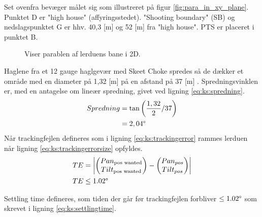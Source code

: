 Set ovenfra bevæger målet sig som illustreret på figur \ref{fig:para_in_xy_plane}.
Punktet D er "high house" (affyringsstedet).
"Shooting boundary" (SB) og nedslagspunktet G er hhv. 40,3 [m] og 52 [m] fra "high house". PTS er placeret i punktet B.\\
\begin{figure}[h!]
\centering
{}
\caption[Lerduens parabel i 2D]{Viser parablen af lerduens bane i 2D.}
\end{figure}

Haglene fra et 12 gauge haglgevær med Skeet Choke spredes så de dækker et område
med en diameter på 1,32 [m] på en afstand på 37 [m] \citep[Pattern and choke]{patternandchoke}.
Spredningsvinklen er, med en antagelse om lineær spredning, givet ved ligning \ref{eq:ks:spredning}.
\begin{align}
  Spredning &= \tan \left(\frac{1,32}{2} / 37 \right) \\
  &= 2,04 \degree
  \label{eq:ks:spredning}
\end{align}
Når trackingfejlen defineres som i ligning \ref{eq:ks:trackingerror} rammes 
lerduen når ligning \ref{eq:ks:trackingerrorsize} opfyldes.
\begin{align}
  TE &= \left | \begin{pmatrix}  Pan_{\text{pos wanted}}\\ Tilt_{\text{pos wanted}}\end{pmatrix} - \begin{pmatrix} Pan_{pos}\\ 
  Tilt_{pos}\end{pmatrix} \right | \label{eq:ks:trackingerror}
  \\
  TE &\leq 1.02\degree
  \label{eq:ks:trackingerrorsize}
\end{align}

Settling time defineres, som tiden der går før trackingfejlen forbliver $\leq 1.02 \degree$ 
som skrevet i ligning \ref{eq:ks:settlingtime}.

